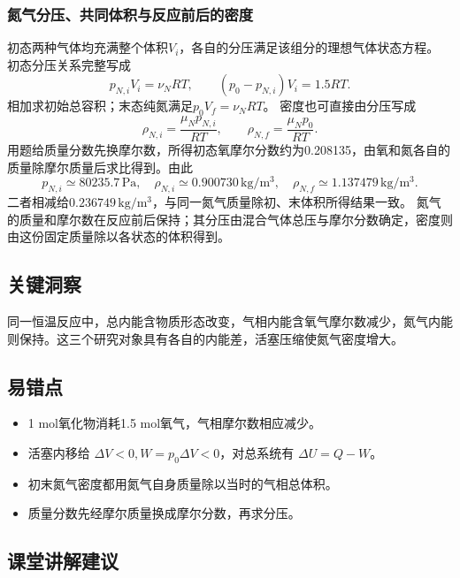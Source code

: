 \documentclass[UTF8,fontset=fandol,a4paper,11pt]{ctexart}
\begin{document}
\subsubsection*{氮气分压、共同体积与反应前后的密度}
初态两种气体均充满整个体积$V_i$，各自的分压满足该组分的理想气体状态方程。
初态分压关系完整写成
\[
p_{N,i}V_i=\nu_NRT,\qquad
(p_0-p_{N,i})V_i=1.5RT.
\]
相加求初始总容积；末态纯氮满足$p_0V_f=\nu_NRT$。
密度也可直接由分压写成
\[
\rho_{N,i}=\frac{\mu_Np_{N,i}}{RT},\qquad
\rho_{N,f}=\frac{\mu_Np_0}{RT}.
\]
用题给质量分数先换摩尔数，所得初态氧摩尔分数约为0.208135，由氧和氮各自的质量除摩尔质量后求比得到。由此
\[
p_{N,i}\simeq80235.7\,\mathrm{Pa},\quad
\rho_{N,i}\simeq0.900730\,\mathrm{kg/m^3},\quad
\rho_{N,f}\simeq1.137479\,\mathrm{kg/m^3}.
\]
二者相减给$0.236749\,\mathrm{kg/m^3}$，与同一氮气质量除初、末体积所得结果一致。
氮气的质量和摩尔数在反应前后保持；其分压由混合气体总压与摩尔分数确定，密度则由这份固定质量除以各状态的体积得到。




\subsection*{关键洞察}

同一恒温反应中，总内能含物质形态改变，气相内能含氧气摩尔数减少，氮气内能则保持。这三个研究对象具有各自的内能差，活塞压缩使氮气密度增大。



\subsection*{易错点}

\begin{itemize}
\item 1 mol氧化物消耗1.5 mol氧气，气相摩尔数相应减少。
\item 活塞内移给 $\Delta V<0,W=p_0\Delta V<0$，对总系统有 $\Delta U=Q-W$。
\item 初末氮气密度都用氮气自身质量除以当时的气相总体积。
\item 质量分数先经摩尔质量换成摩尔分数，再求分压。
\end{itemize}



\subsection*{课堂讲解建议}
\end{document}
